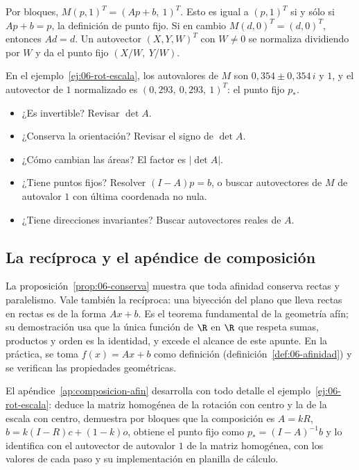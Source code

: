 \begin{demostracion}
Por bloques, \(M(p,1)^T=(Ap+b,\ 1)^T\). Esto es igual a \((p,1)^T\) si y sólo si \(Ap+b=p\),
la definición de punto fijo. Si en cambio \(M(d,0)^T=(d,0)^T\), entonces \(Ad=d\). Un
autovector \((X,Y,W)^T\) con \(W\neq0\) se normaliza dividiendo por \(W\) y da el punto fijo
\((X/W,\ Y/W)\).
\end{demostracion}

En el ejemplo~\ref{ej:06-rot-escala}, los autovalores de \(M\) son \(0{,}354\pm0{,}354\,i\)
y \(1\), y el autovector de \(1\) normalizado es \((0{,}293,\ 0{,}293,\ 1)^T\): el punto fijo
\(p_\ast\).

\begin{idea}
\begin{itemize}
  \item ¿Es invertible? Revisar \(\det A\).
  \item ¿Conserva la orientación? Revisar el signo de \(\det A\).
  \item ¿Cómo cambian las áreas? El factor es \(|\det A|\).
  \item ¿Tiene puntos fijos? Resolver \((I-A)p=b\), o buscar autovectores de \(M\) de
  autovalor \(1\) con última coordenada no nula.
  \item ¿Tiene direcciones invariantes? Buscar autovectores reales de \(A\).
\end{itemize}
\end{idea}

\subsection{La recíproca y el apéndice de composición}\label{sec:06-reciproca}

La proposición~\ref{prop:06-conserva} muestra que toda afinidad conserva rectas y
paralelismo. Vale también la recíproca: una biyección del plano que lleva rectas en rectas
es de la forma \(Ax+b\). Es el teorema fundamental de la geometría afín; su demostración usa
que la única función de \(\R\) en \(\R\) que respeta sumas, productos y orden es la
identidad, y excede el alcance de este apunte. En la práctica, se toma
\(f(x)=Ax+b\) como definición (definición~\ref{def:06-afinidad}) y se verifican las
propiedades geométricas.

El apéndice~\ref{ap:composicion-afin} desarrolla con todo detalle el
ejemplo~\ref{ej:06-rot-escala}: deduce la matriz homogénea de la rotación con centro y la de
la escala con centro, demuestra por bloques que la composición es \(A=kR\),
\(b=k(I-R)c+(1-k)o\), obtiene el punto fijo como \(p_\ast=(I-A)^{-1}b\) y lo identifica con el
autovector de autovalor \(1\) de la matriz homogénea, con los valores de cada paso y su
implementación en planilla de cálculo.

